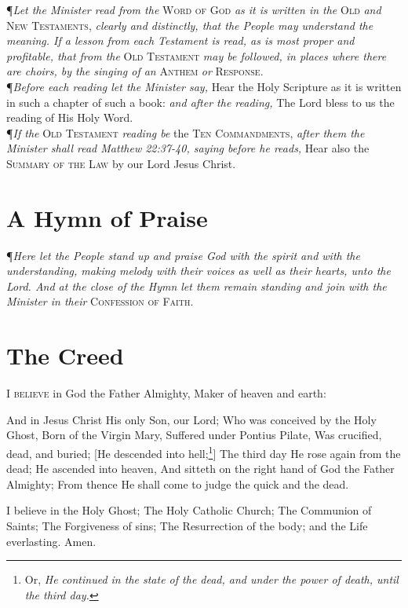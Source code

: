 \P \textit{Let the Minister read from the} \textsc{Word of God} \textit{as it is written in the} \textsc{Old} \textit{and} \textsc{New Testaments,} \textit{clearly and distinctly, that the People may understand the meaning.
If a lesson from each Testament is read, as is most proper and profitable, that from the} \textsc{Old Testament} \textit{may be followed, in places where there are choirs, by the singing of an} \textsc{Anthem} \textit{or} \textsc{Response.} \\

\noindent\P \textit{Before each reading let the Minister say,} Hear the Holy Scripture as it is written in such a chapter of such a book: \textit{and after the reading,} The Lord bless to us the reading of His Holy Word. \\

\noindent\P \textit{If the} \textsc{Old Testament} \textit{reading be} the \textsc{Ten Commandments,} \textit{after them the Minister shall read Matthew 22:37-40, saying before he reads,} Hear also the \textsc{Summary of the Law} by our Lord Jesus Christ.

\section*{A Hymn of Praise}

\P \textit{Here let the People stand up and praise God with the spirit and with the understanding, making melody with their voices as well as their hearts, unto the Lord.
And at the close of the Hymn let them remain standing and join with the Minister in their} \textsc{Confession of Faith.}

\section*{The Creed}

\lettrine{I}{ believe} in God the Father Almighty, Maker of heaven and earth:

And in Jesus Christ His only Son, our Lord; Who was conceived by the Holy Ghost, Born of the Virgin Mary, Suffered under Pontius Pilate, Was crucified, dead, and buried; [He descended into hell;\footnote{Or, \textit{He continued in the state of the dead, and under the power of death, until the third day.}}]
The third day He rose again from the dead; He ascended into heaven, And sitteth on the right hand of God the Father Almighty; From thence He shall come to judge the quick and the dead.

I believe in the Holy Ghost; The Holy Catholic Church; The Communion of Saints; The Forgiveness of sins; The Resurrection of the body; and the Life everlasting. Amen. \\

